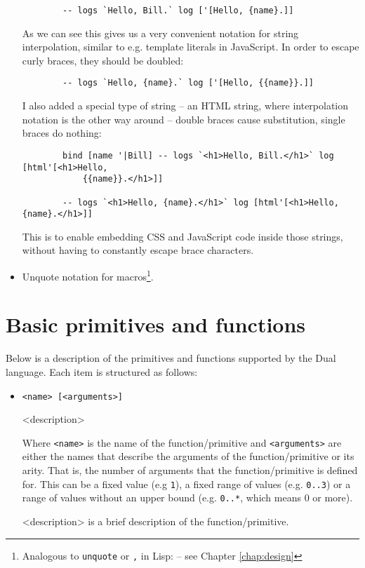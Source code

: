 \begin{itemize}
\begin{lstlisting}
        -- logs `Hello, Bill.` log ['[Hello, {name}.]]
    \end{lstlisting}
    
    As we can see this gives us a very convenient notation for string
    interpolation, similar to e.g. template literals in
    JavaScript\cite{mdn_template_strings}.
    In order to escape curly braces, they should be doubled:
    \begin{lstlisting}
        -- logs `Hello, {name}.` log ['[Hello, {{name}}.]]
    \end{lstlisting}
    
    I also added a special type of string -- an HTML string, where interpolation
    notation is the other way around -- double braces cause substitution, single
    braces do nothing:
    \begin{lstlisting}
        bind [name '|Bill] -- logs `<h1>Hello, Bill.</h1>` log [html'[<h1>Hello,
            {{name}}.</h1>]]
        
        -- logs `<h1>Hello, {name}.</h1>` log [html'[<h1>Hello, {name}.</h1>]]
    \end{lstlisting}
    
    This is to enable embedding CSS and JavaScript code inside those strings,
    without having to constantly escape brace characters.
    
    \item Unquote notation for macros\footnote{Analogous to \texttt{unquote} or
      \texttt{,} in Lisp:
      \cite[Section~1.3.8]{racket_reference}
      -- see Chapter \ref{chap:design}}.
\end{itemize}

\section{Basic primitives and functions}\label{sec:primitives}
Below is a description of the primitives and functions supported by the Dual
language. Each item is structured as follows:
\begin{itemize}
    \item \texttt{<name> [<arguments>]}
    
    <description>
    
    Where \texttt{<name>} is the name of the function/primitive and
    \texttt{<arguments>} are either the names that describe the arguments of the
    function/primitive or its arity. That is, the number of arguments that the
    function/primitive is defined for. This can be a fixed value (e.g
    \texttt{1}), a fixed range of values (e.g. \texttt{0..3}) or a range of
    values without an upper bound (e.g. \texttt{0..*}, which means 0 or more).
    
    <description> is a brief description of the function/primitive.
\end{itemize}

